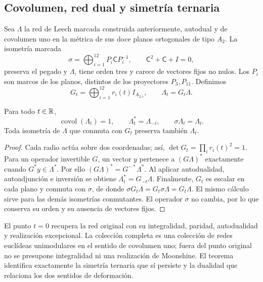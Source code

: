 \subsection{Covolumen, red dual y simetría ternaria}

Sea \(\Lambda\) la red de Leech marcada construida anteriormente, autodual y de covolumen uno en la métrica de sus doce planos ortogonales de tipo \(A_2\). La isometría marcada
\[
 \sigma=\bigoplus_{i=1}^{12}P_i\mathsf C P_i^{-1},\qquad
 \mathsf C^2+\mathsf C+I=0,
\]
preserva el pegado y \(\Lambda\), tiene orden tres y carece de vectores fijos no nulos. Los \(P_i\) son marcos de los planos, distintos de los proyectores \(P_3,P_{11}\). Definimos
\begin{equation}
 G_t=\bigoplus_{i=1}^{12}r_i(t)I_{A_{2,i}},\qquad
 \Lambda_t=G_t\Lambda.
 \label{rec:eq:red}
\end{equation}

\begin{theorem}
\label{rec:thm:red}
Para todo \(t\in\mathbb R\),
\[
 \operatorname{covol}(\Lambda_t)=1,\qquad
 \Lambda_t^*=\Lambda_{-t},\qquad \sigma\Lambda_t=\Lambda_t.
\]
Toda isometría de \(\Lambda\) que conmuta con \(G_t\) preserva también \(\Lambda_t\).
\end{theorem}
\begin{proof}
Cada radio actúa sobre dos coordenadas; así,
\(\det G_t=\prod_i r_i(t)^2=1\). Para un operador invertible \(G\), un vector \(y\) pertenece a \((G\Lambda)^*\) exactamente cuando \(G^*y\in\Lambda^*\). Por ello
\((G\Lambda)^*=G^{-*}\Lambda^*\). Al aplicar autodualidad, autoadjunción e inversión se obtiene \(\Lambda_t^*=G_{-t}\Lambda\). Finalmente, \(G_t\) es escalar en cada plano y conmuta con \(\sigma\), de donde
\(\sigma G_t\Lambda=G_t\sigma\Lambda=G_t\Lambda\). El mismo cálculo sirve para las demás isometrías conmutantes. El operador \(\sigma\) no cambia, por lo que conserva su orden y su ausencia de vectores fijos.
\end{proof}

El punto \(t=0\) recupera la red original con su integralidad, paridad, autodualidad y realización excepcional. La colección completa es una colección de redes euclídeas unimodulares en el sentido de covolumen uno; fuera del punto original no se presupone integralidad ni una realización de Moonshine. El teorema identifica exactamente la simetría ternaria que sí persiste y la dualidad que relaciona los dos sentidos de deformación.


